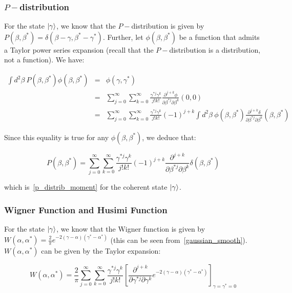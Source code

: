 \subsubsection{$P-$distribution}
For the state $\ket{\gamma}$, we know that the $P-$distribution is given by $P(\beta, \beta^*) =  \delta(\beta - \gamma, \beta^* - \gamma^*)$. Further, let $\phi(\beta, \beta^*)$ be a function that admits a Taylor power series expansion (recall that the $P-$distribution  is a distribution, not a function). We have:

\begin{eqnarray}
    \int d^2 \beta \ P(\beta, \beta^*) \phi(\beta, \beta^*) &=&  \phi(\gamma, \gamma^*) \nonumber\\
    &=&  \sum_{j=0}^\infty \sum_{k=0}^\infty \frac{\gamma^{* j} \gamma^k}{j! k!} \frac{\partial^{j+k} \phi}{\partial \beta^{* j} \partial \beta^k}(0, 0) \nonumber\\
    &=&  \sum_{j=0}^\infty \sum_{k=0}^\infty \frac{\gamma^{* j} \gamma^k}{j! k!} (-1)^{j+k} \int d^2 \beta \ \phi(\beta, \beta^*) \frac{\partial^{j+k} \delta}{\partial \beta^{* j} \partial \beta^k}(\beta, \beta^*)
\end{eqnarray}

Since this equality is true for any $\phi(\beta, \beta^*)$, we deduce that:

\begin{equation}
    P(\beta, \beta^*) = \sum_{j=0}^\infty \sum_{k=0}^\infty \frac{\gamma^{* j} \gamma^k}{j! k!} (-1)^{j+k} \frac{\partial^{j+k}}{\partial \beta^{* j} \partial \beta^k} \delta(\beta, \beta^*)
\end{equation}

which is~\autoref{p_distrib_moment} for the coherent state $\ket{\gamma}$.

\subsubsection{Wigner Function and Husimi Function}
For the state $\ket{\gamma}$, we know that the Wigner function is given by $W(\alpha, \alpha^*) =  \frac{2}{\pi} e^{-2 (\gamma - \alpha) (\gamma^* - \alpha^*)}$ (this can be seen from~\autoref{gaussian_smooth}). $W(\alpha, \alpha^*)$ can be given by the Taylor expansion:

\begin{equation}
    W(\alpha, \alpha^*) = \frac{2}{\pi} \sum_{j=0}^\infty \sum_{k=0}^\infty \frac{\gamma^{* j} \gamma^k}{j! k!} \left[\frac{\partial^{j+k}}{\partial \gamma^{* j} \partial \gamma^k} e^{-2 (\gamma - \alpha) (\gamma^* - \alpha^*)}\right]_{\gamma = \gamma^* = 0}
\end{equation}

